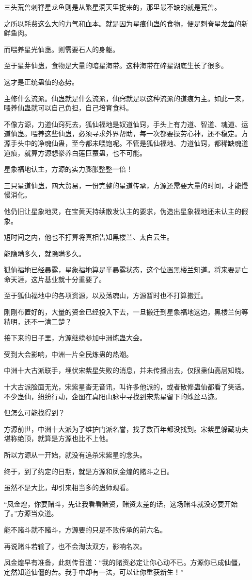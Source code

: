 \begin{this_body}
三头荒兽刺脊星龙鱼则是从繁星洞天里捉来的，那里最不缺的就是荒兽。

之所以耗费这么大的力气和血本。就是因为星痕仙蛊的食物，便是刺脊星龙鱼的新鲜鱼肉。

而喂养星光仙蛊。则需要石人的身躯。

至于星芽仙蛊，食物是大量的暗星海带。这种海带在碎星湖底生长了很多。

这才是正统蛊仙的态势。

主修什么流派。仙蛊就是什么流派，仙窍就是以这种流派的道痕为主。如此一来，喂养仙蛊就可以自己负担，自己培育食料。

不像方源，力道仙窍死去，狐仙福地是奴道仙窍，手头上有力道、智道、魂道、运道仙蛊。喂养这些仙蛊，必须寻求外界帮助，每一次都要操劳心神，还不稳定。方源手头中的净魂仙蛊，至今都未喂饱呢。不管是狐仙福地、力道仙窍，都稀缺魂道道痕，就算方源想豢养白莲巨蚕蛊，也不可能。

星象福地认主，方源的实力膨胀整整一倍！

三只星道仙蛊，四大贸易，一份完整的星道传承，方源还需要大量的时间，才能慢慢消化。

他仍旧让星象地灵，在宝黄天持续散发认主的要求，伪造出星象福地还未认主的假象。

短时间之内，他也不打算将真相告知黑楼兰、太白云生。

能隐瞒多久，就隐瞒多久。

狐仙福地已经暴露，星象福地算是半暴露状态，这个位置黑楼兰知道。将来要是亡命天涯，这片基业就十分重要了。

至于狐仙福地中的各项资源，以及荡魂山，方源暂时也不打算搬迁。

刚刚布置好的，大量的资金已经投入下去，一旦搬迁到星象福地这边，黑楼兰何等精明，还不一清二楚？

接下来的日子里，方源继续参加中洲炼蛊大会。

受到大会影响，中洲一片全民炼蛊的热潮。

中洲十大古派联手，埋伏宋紫星失败的消息，并未传播出去，仅限蛊仙高层知晓。

十大古派脸面无光，宋紫星杳无音讯，叫许多他派的，或者散修蛊仙都看了笑话。不少蛊仙，纷纷行动，企图在真阳山脉中寻找到宋紫星留下的蛛丝马迹。

但怎么可能找得到？

方源前世，中洲十大派为了维护门派名誉，找了数百年都没找到。宋紫星躲藏功夫堪称绝顶，就算是方源也比不上他。

所以方源从一开始，就没有追杀宋紫星的念头。

终于，到了约定的日期，就是方源和凤金煌的赌斗之日。

虽然不是大比，却引来相当多的蛊师观看。

“凤金煌，你要赌斗，先让我看看赌资，赌资太差的话，这场赌斗就没必要开始了。”方源当众道。

能不赌斗就不赌斗，方源要的只是不败传承的前六名。

再说赌斗若输了，也不会淘汰双方，影响名次。

凤金煌早有准备，此刻传音道：“我的赌资必定让你心动不已。方源你已成仙僵，定然知道仙僵的苦。我手中却有一法，可以让你重获新生！”

\end{this_body}

